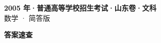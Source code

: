 \documentclass[zihao=-4, a4paper]{ctexart}
\begin{document}
\begin{center}
  {\Large\bfseries 2005 年·普通高等学校招生考试·山东卷·文科}\\[4pt]
  {\large 数学 · 简答版}
\end{center}
\medskip
{}

\clearpage
{}
\begin{center}{\Large\bfseries 答案速查}\end{center}
\medskip

\end{document}

